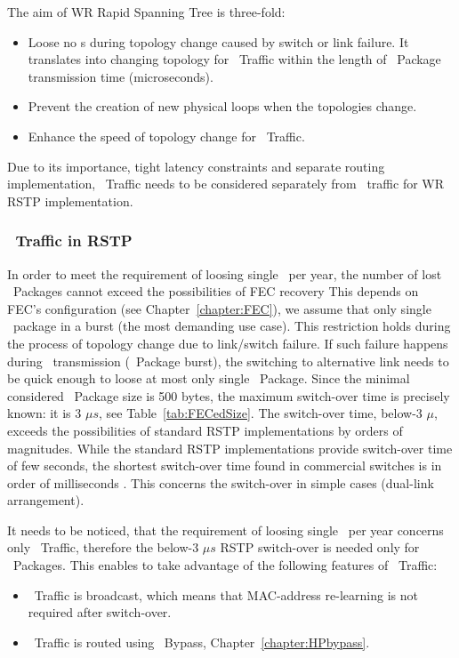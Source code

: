 The aim of WR Rapid Spanning Tree is three-fold:

\begin{itemize}
  \item Loose no \ControlMessage s during topology change caused by switch or
link failure. It translates into changing topology for \HP\ Traffic within
the length of \HP\ Package transmission time (microseconds).
  \item Prevent the creation of new physical loops when the topologies change.
  \item Enhance the speed of topology change for \SP\ Traffic.
\end{itemize}

Due to its importance, tight latency constraints and separate routing
implementation, \HP\ Traffic needs to be considered separately from \SP\ traffic
for WR RSTP implementation. 

 
\subsubsection{\HighPriority\ Traffic in RSTP } 

In order to meet the requirement of loosing single \ControlMessage\  per year,
the number of lost \HP\ Packages cannot exceed the possibilities of FEC recovery
This depends on FEC's configuration (see Chapter~\ref{chapter:FEC}), we assume
that only single \HP\ package in a burst (the most demanding use case). This 
restriction holds during the process of topology change due to link/switch
failure. If such failure happens during \ControlMessage\  transmission (\HP\
Package burst), the switching to alternative link needs to be quick enough to loose
at most only single \HP\ Package. Since the minimal considered \HP\ Package size
is 500 bytes, the maximum switch-over time is precisely known: it is 3 $\mu s$,
see Table~\ref{tab:FECedSize}. The switch-over time, below-3 $\mu $, exceeds
the possibilities of standard RSTP implementations by orders of magnitudes.
While the standard RSTP implementations provide switch-over time of few seconds,
the shortest switch-over time found in commercial switches is in order of
milliseconds \cite{ciscoRSTP}. This concerns the switch-over in simple cases
(dual-link arrangement).

It needs to be noticed, that the requirement of loosing single \ControlMessage\
per year concerns only \HP\ Traffic, therefore the below-3 $\mu s$ RSTP
switch-over is needed only for \HP\ Packages. This enables to take advantage of
the following features of \HP\ Traffic:
\begin{itemize}
  \item \HP\ Traffic is broadcast, which means that  MAC-address re-learning
	is not required after switch-over.
  \item \HP\ Traffic is routed using \HP\ Bypass, 
	Chapter~\ref{chapter:HPbypass}.
\end{itemize}

